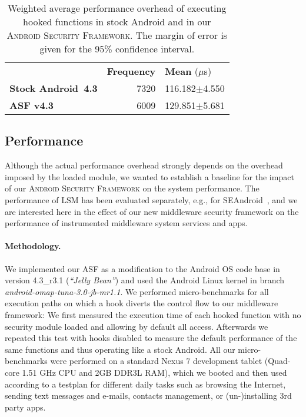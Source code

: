 \documentclass[letterpaper,twocolumn,10pt]{article}
\newcommand{\OURNAME}{\textsc{Android Security Framework}\xspace}
\newcommand{\OURSHORT}{\textsc{ASF}\xspace}
\begin{document}
\begin{table}[t]
  \centering
  \small
  \begin{tabular}{|p{3cm}|r|l|}\cline{2-3}
    \multicolumn{1}{c|}{} & \textbf{Frequency} & \textbf{Mean} ($\mu$s)\\\cline{1-3}
    \textbf{Stock Android~4.3} & 7320 & 116.182$\pm$4.550\\\hline
\textbf{\OURSHORT v4.3} & 6009 & 129.851$\pm$5.681\\\hline
  \end{tabular}
  \caption{Weighted average performance overhead of executing
    hooked functions in stock Android and in our \OURNAME. The
    margin of error is given for the 95\% confidence interval.}
  \label{table:eval:averageperformance}
\end{table}

\subsection{Performance}
\label{sec:eval:performance}

Although the actual performance overhead strongly depends on the overhead imposed by the loaded module, we wanted to establish a baseline for the impact of our \OURNAME on the system performance. The performance of LSM has been evaluated separately, e.g., for SEAndroid~\cite{Smalley2013}, and we are interested here in the effect of our new middleware security framework on the performance of instrumented middleware system services and apps.

\paragraph{Methodology.}
We implemented our \OURSHORT as a modification to the Android OS code base in version 4.3\_r3.1 (\textit{``Jelly Bean''}) and used the Android Linux kernel in branch \textit{android-omap-tuna-3.0-jb-mr1.1}. We performed micro-benchmarks for all execution paths on which a hook diverts the control flow to our middleware framework: We first measured the execution time of each hooked function with no security module loaded and allowing by default all access. Afterwards we repeated this test with hooks disabled to measure the default performance of the same functions and thus operating like a stock Android. All our micro-benchmarks were performed on a standard Nexus 7 development tablet (Quad-core 1.51 GHz CPU and 2GB DDR3L RAM), which we booted and then used according to a testplan for different daily tasks such as browsing the Internet, sending text messages and e-mails, contacts management, or (un-)installing 3rd party apps.
\end{document}
